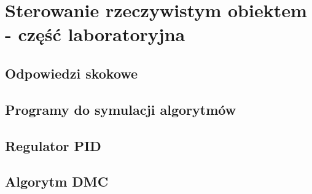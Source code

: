 \chapter{Sterowanie rzeczywistym obiektem - część laboratoryjna}

\section{Odpowiedzi skokowe}

\section{Programy do symulacji algorytmów}

\section{Regulator PID}

\section{Algorytm DMC}